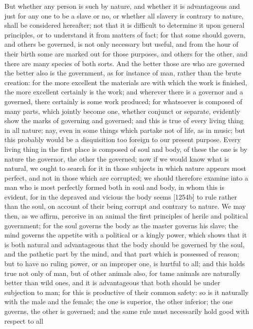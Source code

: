 But whether any person is such by nature, and whether it is advantageous
and just for any one to be a slave or no, or whether all slavery is
contrary to nature, shall be considered hereafter; not that it is
difficult to determine it upon general principles, or to understand it
from matters of fact; for that some should govern, and others be governed,
is not only necessary but useful, and from the hour of their birth some
are marked out for those purposes, and others for the other, and there are
many species of both sorts. And the better those are who are governed the
better also is the government, as for instance of man, rather than the
brute creation: for the more excellent the materials are with which the
work is finished, the more excellent certainly is the work; and wherever
there is a governor and a governed, there certainly is some work produced;
for whatsoever is composed of many parts, which jointly become one,
whether conjunct or separate, evidently show the marks of governing and
governed; and this is true of every living thing in all nature; nay, even
in some things which partake not of life, as in music; but this probably
would be a disquisition too foreign to our present purpose. Every living
thing in the first place is composed of soul and body, of these the one is
by nature the governor, the other the governed; now if we would know what
is natural, we ought to search for it in those subjects in which nature
appears most perfect, and not in those which are corrupted; we should
therefore examine into a man who is most perfectly formed both in soul and
body, in whom this is evident, for in the depraved and vicious the body
seems [1254b] to rule rather than the soul, on account of their being
corrupt and contrary to nature. We may then, as we affirm, perceive in an
animal the first principles of herile and political government; for the
soul governs the body as the master governs his slave; the mind governs
the appetite with a political or a kingly power, which shows that it is
both natural and advantageous that the body should be governed by the
soul, and the pathetic part by the mind, and that part which is possessed
of reason; but to have no ruling power, or an improper one, is hurtful to
all; and this holds true not only of man, but of other animals also, for
tame animals are naturally better than wild ones, and it is advantageous
that both should be under subjection to man; for this is productive of
their common safety: so is it naturally with the male and the female; the
one is superior, the other inferior; the one governs, the other is
governed; and the same rule must necessarily hold good with respect to all
